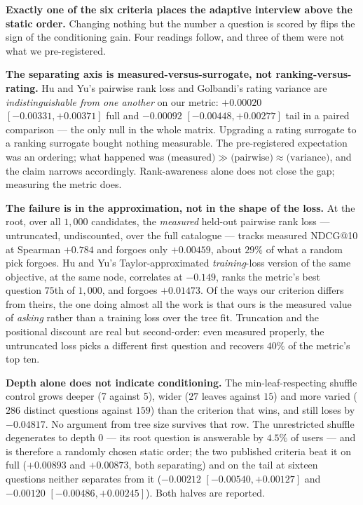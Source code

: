 \documentclass[11pt]{article}
\begin{document}
\textbf{Exactly one of the six criteria places the adaptive interview above the static order.}
Changing nothing but the number a question is scored by flips the sign of the conditioning gain. Four
readings follow, and three of them were not what we pre-registered.

\textbf{The separating axis is measured-versus-surrogate, not ranking-versus-rating.} Hu and Yu's
pairwise rank loss and Golbandi's rating variance are \emph{indistinguishable from one another} on
our metric: $+0.00020$ $[-0.00331,+0.00371]$ full and $-0.00092$ $[-0.00448,+0.00277]$ tail in a
paired comparison --- the only null in the whole matrix. Upgrading a rating surrogate to a ranking
surrogate bought nothing measurable. The pre-registered expectation was an ordering; what happened
was $\text{(measured)} \gg \text{(pairwise)} \approx \text{(variance)}$, and the claim narrows
accordingly. Rank-awareness alone does not close the gap; measuring the metric does.

\textbf{The failure is in the approximation, not in the shape of the loss.} At the root, over all
$1{,}000$ candidates, the \emph{measured} held-out pairwise rank loss --- untruncated, undiscounted,
over the full catalogue --- tracks measured NDCG@10 at Spearman $+0.784$ and forgoes only $+0.00459$,
about $29\%$ of what a random pick forgoes. Hu and Yu's Taylor-approximated \emph{training}-loss
version of the same objective, at the same node, correlates at $-0.149$, ranks the metric's best
question $75$th of $1{,}000$, and forgoes $+0.01473$. Of the ways our criterion differs from theirs,
the one doing almost all the work is that ours is the measured value of \emph{asking} rather than a
training loss over the tree fit. Truncation and the positional discount are real but second-order:
even measured properly, the untruncated loss picks a different first question and recovers $40\%$ of
the metric's top ten.

\textbf{Depth alone does not indicate conditioning.} The min-leaf-respecting shuffle control grows deeper (7 against 5),
wider ($27$ leaves against $15$) and more varied ($286$ distinct questions against $159$) than the
criterion that wins, and still loses by $-0.04817$. No argument from tree size survives that row. The
unrestricted shuffle degenerates to depth $0$ --- its root question is answerable by $4.5\%$ of users
--- and is therefore a randomly chosen static order; the two published criteria beat it on full
($+0.00893$ and $+0.00873$, both separating) and on the tail at sixteen questions neither separates
from it ($-0.00212$ $[-0.00540,+0.00127]$ and $-0.00120$ $[-0.00486,+0.00245]$). Both halves are
reported.
\end{document}

